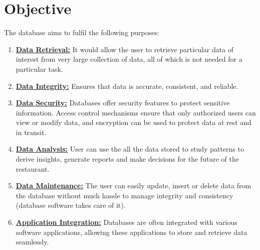 \section{Objective} \label{cap:objective}

The database aims to fulfil the following purposes:
\begin{enumerate}
    \item \underline{\textbf{Data Retrieval:}} It would allow the user to retrieve particular data of interest from very large collection of data, all of which is not needed for a particular task.
    \item \underline{\textbf{Data Integrity:}} Ensures that data is accurate, consistent, and reliable.
    \item \underline{\textbf{Data Security:}} Databases offer security features to protect sensitive information. Access control mechanisms ensure that only authorized users can view or modify data, and encryption can be used to protect data at rest and in transit.
    \item \underline{\textbf{Data Analysis:}} User can use the all the data stored to study patterns to derive insights, generate reports and make decisions for the future of the restaurant.
    \item \underline{\textbf{Data Maintenance:}} The user can easily update, insert or delete data from the database without much hassle to manage integrity and consistency (database software takes care of it).
    \item \underline{\textbf{Application Integration:}} Databases are often integrated with various software applications, allowing these applications to store and retrieve data seamlessly.
\end{enumerate}
